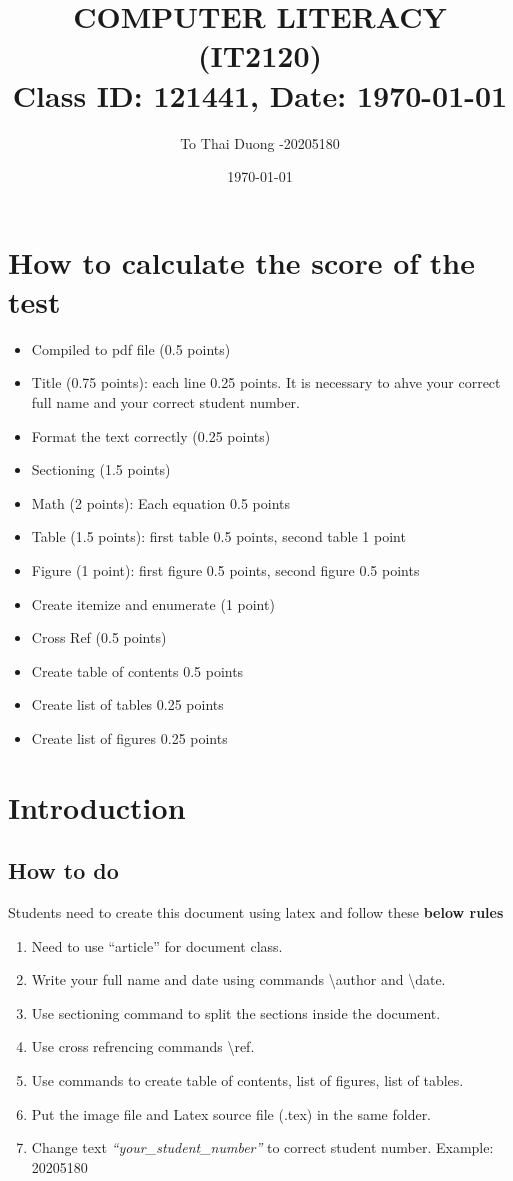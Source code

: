 \documentclass{article}
\title{COMPUTER LITERACY (IT2120)\\Class ID: 121441, Date: {\today}}
\author{To Thai Duong -20205180}
\date{\today}
\begin{document}
\maketitle
\section{How to calculate the score of the test}
\begin{itemize}
\item Compiled to pdf file (0.5 points)
\item Title (0.75 points): each line 0.25 points. It is necessary to ahve your correct full name and your correct student number.
\item Format the text correctly (0.25 points)
\item Sectioning (1.5 points)
\item Math (2 points): Each equation 0.5 points
\item Table (1.5 points): first table 0.5 points, second table 1 point
\item Figure (1 point): first figure 0.5 points, second figure 0.5 points
\item Create itemize and enumerate (1 point)
\item Cross Ref (0.5 points)
\item Create table of contents 0.5 points
\item Create list of tables 0.25 points
\item Create list of figures 0.25 points
\end{itemize}
\section{Introduction}
\subsection{How to do}
Students need to create this document using latex and follow these \textbf{below rules}
\begin{enumerate}
\item Need to use ``article'' for document class.
\item Write your full name and date using commands \textbackslash author and \textbackslash date.
\item Use sectioning command to split the sections inside the document.
\item Use cross refrencing commands \textbackslash ref.
\item Use commands to create table of contents, list of figures, list of tables.
\item Put the image file and Latex source file (.tex) in the same folder.
\item Change text \textit{``your\_student\_number''} to correct student number. Example: 20205180
\end{enumerate}
\end{document}
